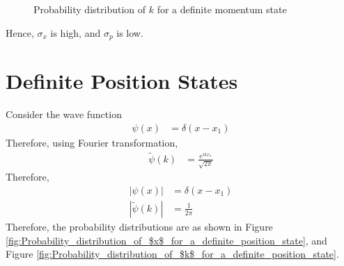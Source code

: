 \documentclass[titlepage, fleqn, a4paper, 12pt, twoside]{article}
\theoremstyle{definition}
\theoremstyle{theorem}
\renewcommand{\tilde}{\widetilde}
\begin{document}
\begin{figure}[h]
	\centering
	\caption{Probability distribution of $k$ for a definite momentum state}
	\label{fig:Probability_distribution_of_$k$_for_a_definite_momentum_state}
\end{figure}

Hence, $\sigma_x$ is high, and $\sigma_p$ is low.

\section{Definite Position States}

Consider the wave function
\begin{align*}
	\psi(x) &= \delta(x - x_1)
\end{align*}
Therefore, using Fourier transformation,
\begin{align*}
	\tilde{\psi}(k) &= \frac{e^{i k x_1}}{\sqrt{2 \pi}}
\end{align*}
Therefore,
\begin{align*}
	\left| \psi(x) \right| &= \delta(x - x_1)\\
	\left| \tilde{\psi}(k) \right| &= \frac{1}{2 \pi}
\end{align*}
Therefore, the probability distributions are as shown in Figure \ref{fig:Probability_distribution_of_$x$_for_a_definite_position_state}, and Figure \ref{fig:Probability_distribution_of_$k$_for_a_definite_position_state}.
\end{document}
